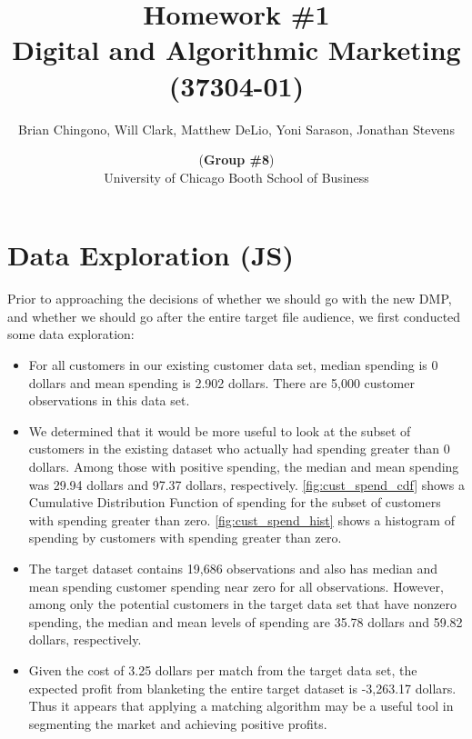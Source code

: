 



\title{Homework \#1\\
Digital and Algorithmic Marketing (37304-01)}
\author{
Brian Chingono, Will Clark, Matthew DeLio, Yoni Sarason, Jonathan Stevens \and (\textbf{Group \#8})\\
University of Chicago Booth School of Business}

\maketitle

\section{Data Exploration (JS)}

Prior to approaching the decisions of whether we should go with the new DMP, and whether we should go after the entire target file audience, we first conducted some data exploration:  
\begin{itemize}

\item For all customers in our existing customer data set, median spending is 0 dollars and mean spending is 2.902 dollars. There are 5,000 customer observations in this data set.

\item We determined that it would be more useful to look at the subset of customers in the existing dataset who actually had spending greater than 0 dollars.  Among those with positive spending, the median and mean spending was 29.94 dollars and 97.37 dollars, respectively.  \vref{fig:cust_spend_cdf} shows a Cumulative Distribution Function of spending for the subset of customers with spending greater than zero. \vref{fig:cust_spend_hist} shows a histogram of spending by customers with spending greater than zero.  

\item The target dataset contains 19,686 observations and also has median and mean spending customer spending near zero for all observations.  However, among only the potential customers in the target data set that have nonzero spending, the median and mean levels of spending are 35.78 dollars and 59.82 dollars, respectively. 

\item Given the cost of 3.25 dollars per match from the target data set, the expected profit from blanketing the entire target dataset is -3,263.17 dollars.  Thus it appears that applying a matching algorithm may be a useful tool in segmenting the market and achieving positive profits.  

\end{itemize}

